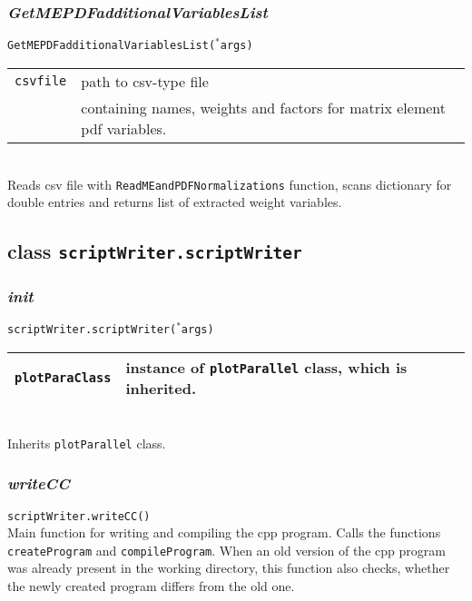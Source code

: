 \documentclass[12pt, a4paper]{article}
\newcommand{\args}{$^*$args}
\begin{document}
\subsubsection{\textit{ GetMEPDFadditionalVariablesList }}
\texttt{GetMEPDFadditionalVariablesList(\args)}\\
\begin{tabular}{r|l}
\hline
\texttt{csvfile}	& path to csv-type file \\
					& containing names, weights and factors for matrix element pdf variables.\\
\hline
\end{tabular}
\\
Reads csv file with \texttt{ReadMEandPDFNormalizations} function, scans dictionary for double entries and returns list of extracted weight variables.






\subsection{class \texttt{scriptWriter.scriptWriter}}

\subsubsection{\textit{init}}
\texttt{scriptWriter.scriptWriter(\args)}\\
\begin{tabular}{r|l}
\hline
\texttt{plotParaClass} 	& instance of \texttt{plotParallel} class, which is inherited.\\
\hline
\end{tabular}
\\
Inherits \texttt{plotParallel} class.


\subsubsection{\textit{writeCC}}
\label{scriptWriter}
\texttt{scriptWriter.writeCC()}\\
Main function for writing and compiling the cpp program. Calls the functions \texttt{createProgram} and \texttt{compileProgram}.
When an old version of the cpp program was already present in the working directory, this function also checks, whether the newly created program differs from the old one.
\end{document}
